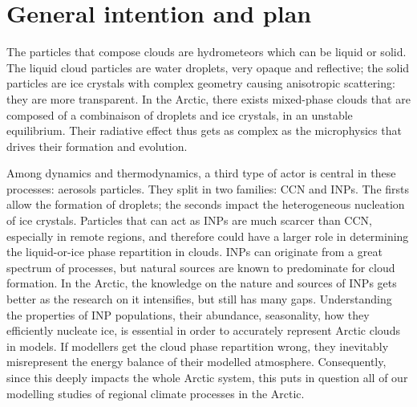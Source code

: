     \vspace{\baselineskip}

\section{General intention and plan}
\label{sec:general_plan}
The particles that compose clouds are hydrometeors which can be liquid or solid. The liquid cloud particles are water droplets, very opaque and reflective; the solid particles are ice crystals with complex geometry causing anisotropic scattering: they are more transparent.
In the Arctic, there exists mixed-phase clouds that are composed of a combinaison of droplets and ice crystals, in an unstable equilibrium. Their radiative effect thus gets as complex as the microphysics that drives their formation and evolution.

Among dynamics and thermodynamics, a third type of actor is central in these processes: aerosols particles.
They split in two families: CCN and INPs. The firsts allow the formation of droplets; the seconds impact the heterogeneous nucleation of ice crystals.
Particles that can act as INPs are much scarcer than CCN, especially in remote regions, and therefore could have a larger role in determining the liquid-or-ice phase repartition in clouds. 
INPs can originate from a great spectrum of processes, but natural sources are known to predominate for cloud formation.
In the Arctic, the knowledge on the nature and sources of INPs gets better as the research on it intensifies, but still has many gaps.
Understanding the properties of INP populations, their abundance, seasonality, how they efficiently nucleate ice, is essential in order to accurately represent Arctic clouds in models.
If modellers get the cloud phase repartition wrong, they inevitably misrepresent the energy balance of their modelled atmosphere. Consequently, since this deeply impacts the whole Arctic system, this puts in question all of our modelling studies of regional climate processes in the Arctic. 
\vspace{\baselineskip}

